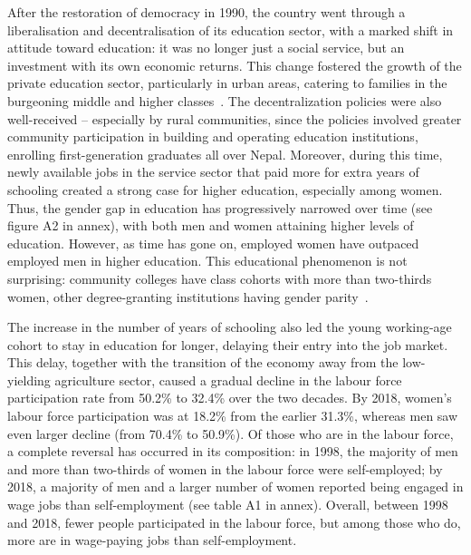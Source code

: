 After the restoration of democracy in 1990, the country went through a liberalisation and decentralisation of its education sector, with a marked shift in attitude toward education: it was no longer just a social service, but an investment with its own economic returns. This change fostered the growth of the private education sector, particularly in urban areas, catering to families in the burgeoning middle and higher classes~\citep{Carney2009}. The decentralization policies were also well-received -- especially by rural communities, since the policies involved greater community participation in building and operating education institutions, enrolling first-generation graduates all over Nepal. Moreover, during this time, newly available jobs in the service sector that paid more for extra years of schooling created a strong case for higher education, especially among women. Thus, the gender gap in education has progressively narrowed over time (see figure A2 in annex), with both men and women attaining higher levels of education. However, as time has gone on, employed women have outpaced employed men in higher education. This educational phenomenon is not surprising: community colleges have class cohorts with more than two-thirds women, other degree-granting institutions having gender parity~\citep{Ugc2022}.\par 

% 
	
The increase in the number of years of schooling also led the young working-age cohort to stay in education for longer, delaying their entry into the job market. This delay, together with the transition of the economy away from the low-yielding agriculture sector, caused a gradual decline in the labour force participation rate from 50.2\% to 32.4\% over the two decades. By 2018, women’s labour force participation was at 18.2\% from the earlier 31.3\%, whereas men saw even larger decline (from 70.4\% to 50.9\%). Of those who are in the labour force, a complete reversal has occurred in its composition: in 1998, the majority of men and more than two-thirds of women in the labour force were self-employed; by 2018, a majority of men and a larger number of women reported being engaged in wage jobs than self-employment (see table A1 in annex). Overall, between 1998 and 2018, fewer people participated in the labour force, but among those who do, more are in wage-paying jobs than self-employment.\par    

